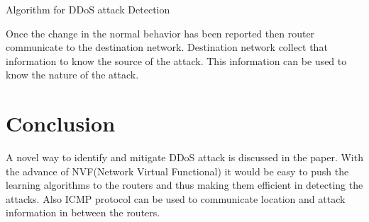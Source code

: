\documentclass[10pt,oneside,a4paper]{report}
\begin{document}
\begin{algorithm}
\caption{Algorithm for DDoS attack Detection}\label{detectmitigate}
  \begin{algorithmic}[1]
  \end{algorithmic}
\end{algorithm}

Once the change in the normal behavior has been reported then router communicate to the destination network. Destination network collect that information to know the source of the attack. This information can be used to know the nature of the attack.

\section{Conclusion}
A novel way to identify and mitigate DDoS attack is discussed in the paper. With the advance of NVF(Network Virtual Functional) it would be easy to push the learning algorithms to the routers and thus making them efficient in detecting the attacks. Also ICMP protocol can be used to communicate location and attack information in between the routers.

\end{document}
